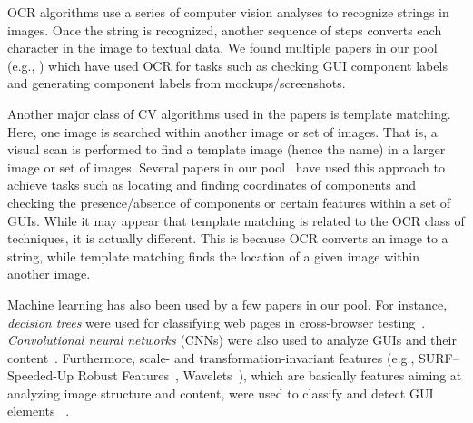 OCR algorithms use a series of computer vision analyses
to recognize strings in images.
Once the string is recognized, another sequence of steps
converts each character in the image to textual data.
We found multiple papers in our pool (e.g., \cite{Chang-2010-CHI, Amalfitano-2014-WISE,
Nguyen-2015-ASE, Ponzanelli-2016-ICSE, Bao-2018-TSE, Tanno-2018-ICSTW, Xiao-2019-ICSE})
which have used OCR for tasks such as checking GUI component labels and
generating component labels from mockups/screenshots.

Another major class of CV algorithms used in the papers is template matching.
Here, one image is searched within another image or set of images.
That is, a visual scan is performed to find a template image (hence the name)
in a larger image or set of images.
Several papers in our pool~\cite{Chang-2010-CHI, Semenenko-2013-ICSM,
	Lin-2014-TSE, Bao-2017-EMSE, Chen-2017-IUI, Leotta-2018-STVR,
	Stocco-2018-FSE, Tanno-2018-ICSTW} have used this approach
to achieve tasks such as locating and finding coordinates of components and
checking the presence/absence of components or certain features within
a set of GUIs. While it may appear that template matching 
is related to the OCR class of techniques, it is actually different. 
This is because OCR converts an image to a string, while template matching finds the location of a given image within another image. 

Machine learning has also been used by a few papers in our pool.
For instance, \emph{decision trees} were used for classifying web pages
in cross-browser testing~\cite{Choudhary-2012-ICST,Semenenko-2013-ICSM}.
\emph{Convolutional neural networks} (CNNs) were also used
to analyze GUIs and their content~\cite{Moran-TSE-2018,Semenenko-2013-ICSM}.
Furthermore, scale- and transformation-invariant features
(e.g.,  SURF--Speeded-Up Robust Features~\cite{ref:SURF}, Wavelets~\cite{ref:wavelet}),
which are basically features aiming at analyzing image structure and content,
were used to classify and detect GUI elements
~\cite{Xiao-2019-ICSE,Stocco-2018-FSE,Kuchta-2018-EMSE,Bao-2017-EMSE}.






